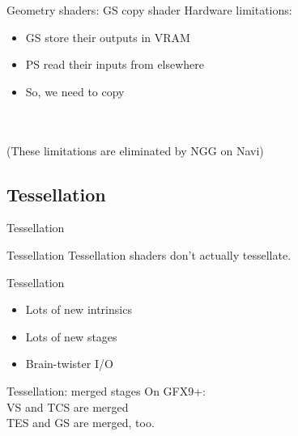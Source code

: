 \documentclass[aspectratio=169,t,xcolor=table]{beamer}
\begin{document}
\begin{frame}{Geometry shaders: GS copy shader}
    \normalsize
    Hardware limitations:
    \LARGE
    \begin{itemize}
        \item GS store their outputs in VRAM
        \item PS read their inputs from elsewhere
        \item So, we need to copy
    \end{itemize}
    \ \\
    \ \\
    \normalsize
    (These limitations are eliminated by NGG on Navi)
    
\end{frame}

\subsection{Tessellation}

\begin{frame}{Tessellation}
\end{frame}

\begin{frame}{Tessellation}
    \LARGE
    Tessellation shaders don't actually tessellate.
\end{frame}

\begin{frame}{Tessellation}
    \LARGE
    \begin{itemize}
        \item Lots of new intrinsics
        \item Lots of new stages
        \item Brain-twister I/O
    \end{itemize}
\end{frame}

\begin{frame}{Tessellation: merged stages}
    \normalsize
    On GFX9+: \\
    \LARGE
    VS and TCS are merged \\
    TES and GS are merged, too.
\end{frame}
\end{document}
